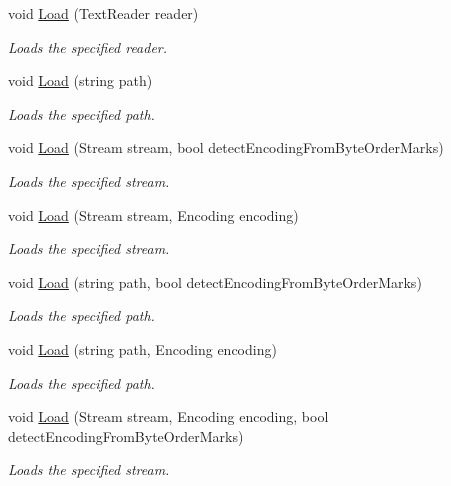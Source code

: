 \begin{DoxyCompactItemize}
void \hyperlink{class_html_agility_pack_1_1_mixed_code_document_a3b181063594cb5f78176831d658b646b}{Load} (Text\+Reader reader)
\begin{DoxyCompactList}\small\item\em Loads the specified reader. \end{DoxyCompactList}\item 
void \hyperlink{class_html_agility_pack_1_1_mixed_code_document_ac8ff0c1ee31286ee2dd875dd994a600f}{Load} (string path)
\begin{DoxyCompactList}\small\item\em Loads the specified path. \end{DoxyCompactList}\item 
void \hyperlink{class_html_agility_pack_1_1_mixed_code_document_a46f1ad69cccbcb03a86533948a240e67}{Load} (Stream stream, bool detect\+Encoding\+From\+Byte\+Order\+Marks)
\begin{DoxyCompactList}\small\item\em Loads the specified stream. \end{DoxyCompactList}\item 
void \hyperlink{class_html_agility_pack_1_1_mixed_code_document_ab122cc473dbdec79c070d14e81b0535a}{Load} (Stream stream, Encoding encoding)
\begin{DoxyCompactList}\small\item\em Loads the specified stream. \end{DoxyCompactList}\item 
void \hyperlink{class_html_agility_pack_1_1_mixed_code_document_aea6a823ade2433568bda89678b0281f2}{Load} (string path, bool detect\+Encoding\+From\+Byte\+Order\+Marks)
\begin{DoxyCompactList}\small\item\em Loads the specified path. \end{DoxyCompactList}\item 
void \hyperlink{class_html_agility_pack_1_1_mixed_code_document_ae93c8beed86c3ab3de863705ff0562b5}{Load} (string path, Encoding encoding)
\begin{DoxyCompactList}\small\item\em Loads the specified path. \end{DoxyCompactList}\item 
void \hyperlink{class_html_agility_pack_1_1_mixed_code_document_a52034e0257211603b51b4cb3fefe8150}{Load} (Stream stream, Encoding encoding, bool detect\+Encoding\+From\+Byte\+Order\+Marks)
\begin{DoxyCompactList}\small\item\em Loads the specified stream. \end{DoxyCompactList}\item 

\end{DoxyCompactItemize}
